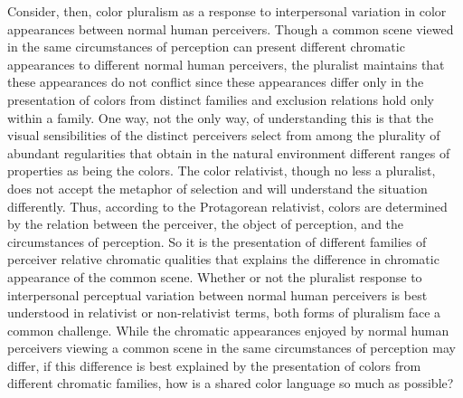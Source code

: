 \documentclass[12pt]{article}
\begin{document}
Consider, then, color pluralism as a response to interpersonal variation in color appearances between normal human perceivers. Though a common scene viewed in the same circumstances of perception can present different chromatic appearances to different normal human perceivers, the pluralist maintains that these appearances do not conflict since these appearances differ only in the presentation of colors from distinct families and exclusion relations hold only within a family. One way, not the only way, of understanding this is that the visual sensibilities of the distinct perceivers select from among the plurality of abundant regularities that obtain in the natural environment different ranges of properties as being the colors. The color relativist, though no less a pluralist, does not accept the metaphor of selection and will understand the situation differently. Thus, according to the Protagorean relativist, colors are determined by the relation between the perceiver, the object of perception, and the circumstances of perception. So it is the presentation of different families of perceiver relative chromatic qualities that explains the difference in chromatic appearance of the common scene. Whether or not the pluralist response to interpersonal perceptual variation between normal human perceivers is best understood in relativist or non-relativist terms, both forms of pluralism face a common challenge. While the chromatic appearances enjoyed by normal human perceivers viewing a common scene in the same circumstances of perception may differ, if this difference is best explained by the presentation of colors from different chromatic families, how is a shared color language so much as possible? 
\end{document}
